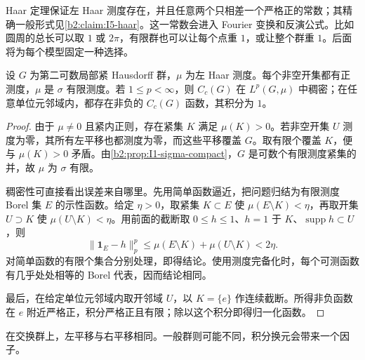 Haar 定理保证左 Haar 测度存在，并且任意两个只相差一个严格正的常数；其精确一般形式见\cref{b2:claim:I5-haar}。这一常数会进入 Fourier 变换和反演公式。比如圆周的总长可以取 \(1\) 或 \(2\pi\)，有限群也可以让每个点重 \(1\)，或让整个群重 \(1\)。后面将为每个模型固定一种选择。

\begin{proposition}[开集、紧集与连续逼近]
\label{b2:prop:I1-haar-basic}
设 \(G\) 为第二可数局部紧 Hausdorff 群，\(\mu\) 为左 Haar 测度。每个非空开集都有正测度，\(\mu\) 是 \(\sigma\) 有限测度。若 \(1\le p<\infty\)，则 \(C_c(G)\) 在 \(L^p(G,\mu)\) 中稠密；在任意单位元邻域内，都存在非负的 \(C_c(G)\) 函数，其积分为 \(1\)。
\end{proposition}
\begin{proof}
由于 \(\mu\ne0\) 且紧内正则，存在紧集 \(K\) 满足 \(\mu(K)>0\)。若非空开集 \(U\) 测度为零，其所有左平移也都测度为零，而这些平移覆盖 \(G\)。取有限个覆盖 \(K\)，便与 \(\mu(K)>0\) 矛盾。由\cref{b2:prop:I1-sigma-compact}，\(G\) 是可数个有限测度紧集的并，故 \(\mu\) 为 \(\sigma\) 有限。

稠密性可直接看出误差来自哪里。先用简单函数逼近，把问题归结为有限测度 Borel 集 \(E\) 的示性函数。给定 \(\eta>0\)，取紧集 \(K\subset E\) 使 \(\mu(E\setminus K)<\eta\)，再取开集 \(U\supset K\) 使 \(\mu(U\setminus K)<\eta\)。用前面的截断取 \(0\le h\le1\)、\(h=1\) 于 \(K\)、\(\operatorname{supp}h\subset U\)，则
\[
 \|\mathbf1_E-h\|_p^p\le\mu(E\setminus K)+\mu(U\setminus K)<2\eta.
\]
对简单函数的有限个集合分别处理，即得结论。使用测度完备化时，每个可测函数有几乎处处相等的 Borel 代表，因而结论相同。

最后，在给定单位元邻域内取开邻域 \(U\)，以 \(K=\{e\}\) 作连续截断。所得非负函数在 \(e\) 附近严格正，积分严格正且有限；除以这个积分即得归一化函数。
\end{proof}

在交换群上，左平移与右平移相同。一般群则可能不同，积分换元会带来一个因子。

